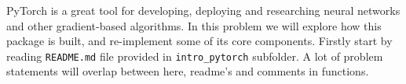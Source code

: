 \documentclass{article}
\begin{document}

\begin{aprob}
    \label{code-pytorch}
    PyTorch is a great tool for developing, deploying and researching neural networks and other gradient-based algorithms.
    In this problem we will explore how this package is built, and re-implement some of its core components.
    Firstly start by reading \texttt{README.md} file provided in \texttt{intro\_pytorch} subfolder.
    A lot of problem statements will overlap between here, readme's and comments in functions.
    

\end{aprob}
\end{document}
